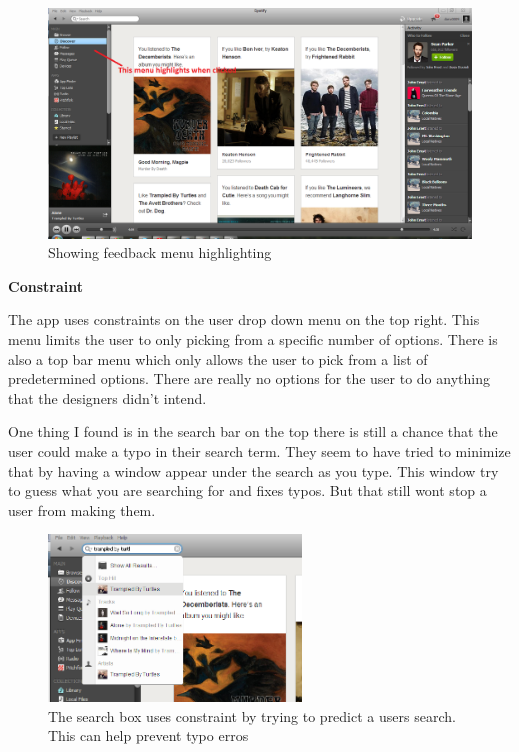\documentclass[a4paper,12pt]{article}
\begin{document}
\begin{figure}[h!]
\centering
\includegraphics[width=1\textwidth]{feedback}
\caption{Showing feedback menu highlighting}
\end{figure}

\textbf{Constraint}

The app uses constraints on the user drop down menu on the top right.  This menu limits the user to only picking from a specific number of options.  There is also a top bar menu which only allows the user to pick from a list of predetermined options.  There are really no options for the user to do anything that the designers didn't intend.

One thing I found is in the search bar on the top there is still a chance that the user could make a typo in their search term.  They seem to have tried to minimize that by having a window appear under the search as you type.  This window try to guess what you are searching for and fixes typos.  But that still wont stop a user from making them.

\begin{figure}[H]
\centering
\includegraphics[width=0.6\textwidth]{constraint}
\caption{The search box uses constraint by trying to predict a users search.  This can help prevent typo erros}
\end{figure}
\end{document}
